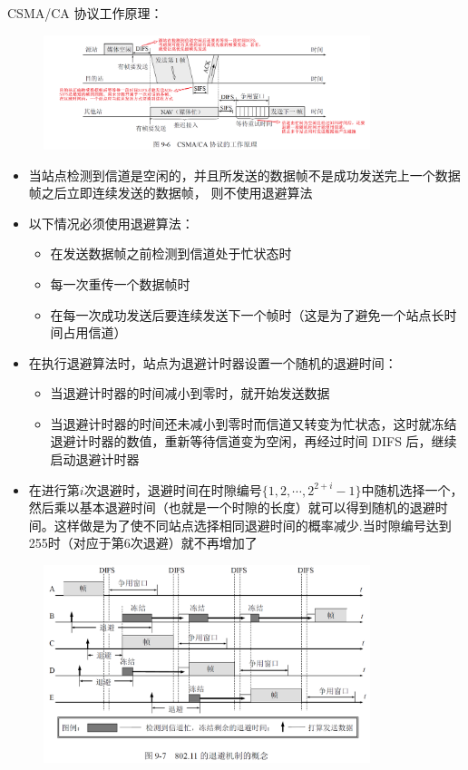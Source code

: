 \documentclass[cs4size,a4paper,10pt]{ctexart}
\begin{document}
	CSMA/CA 协议工作原理：
	\begin{figure}[H]
		\centering
		\includegraphics[width=0.85\textwidth]{img/3.4.3.3}
	\end{figure}

	\begin{itemize}
		\item 当站点检测到信道是空闲的，并且所发送的数据帧不是成功发送完上一个数据帧之后立即连续发送的数据帧，
		则不使用退避算法
		\item 以下情况必须使用退避算法：
		\begin{itemize}
			\item 在发送数据帧之前检测到信道处于忙状态时
			\item 每一次重传一个数据帧时
			\item 在每一次成功发送后要连续发送下一个帧时（这是为了避免一个站点长时间占用信道）
		\end{itemize}
		\item 在执行退避算法时，站点为退避计时器设置一个随机的退避时间：
		\begin{itemize}
			\item 当退避计时器的时间减小到零时，就开始发送数据
			\item 当退避计时器的时间还未减小到零时而信道又转变为忙状态，这时就冻结退避计时器的数值，重新等待信道变为空闲，再经过时间 DIFS 后，继续启动退避计时器
		\end{itemize}
		\item 在进行第$i$次退避时，退避时间在时隙编号$\{1,2,\cdots, 2^{2+i}-1\}$中随机选择一个，然后乘以基本退避时间（也就是一个时隙的长度）就可以得到随机的退避时间。这样做是为了使不同站点选择相同退避时间的概率减少.当时隙编号达到255时（对应于第6次退避）就不再增加了
	\end{itemize}

	\begin{figure}[H]
		\centering
		\includegraphics[width=0.85\textwidth]{img/3.4.3.4}
	\end{figure}
\end{document}
